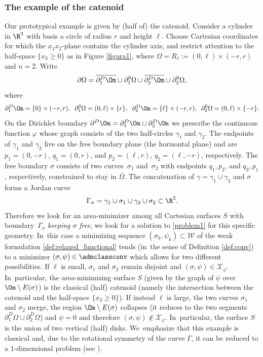 \subsubsection*{The example of the catenoid}
Our prototypical example is given by (half of) the catenoid.
Consider a cylinder in $\R^3$ with basis a circle of radius $r$
and height $\ell$.
Choose Cartesian coordinates for which the $x_1x_2$-plane
contains the cylinder axis, and restrict attention to the half-space
$\{x_3\geq0\}$ as
in Figure \ref{figura1},
where $\Omega=R_\ell := (0,\ell)\times(-r,r)$ and $n=2$.
Write
\[
\partial \Omega=\overline{\partial^D_1\Om}\cup\partial^0_1\Omega\cup \overline{\partial^D_2\Om}\cup \partial^0_2\Omega,
\]
where
\[
\partial^D_1\Om=\{0\}\times(-r,r),\;\; \partial^0_1\Omega=(0,\ell)\times\{r\},\;\; \partial^D_2\Om=\{\ell\}\times(-r,r),\;\; \partial^0_2\Omega=(0,\ell)\times\{-r\}.
\]
On the Dirichlet boundary $\partial^D\Om=\partial^D_1\Om\cup\partial^D_2\Om$ we prescribe the continuous function $\varphi$ whose graph
consists of the two half-circles $\gamma_1$ and $\gamma_2$. The endpoints of $\gamma_1$ and $\gamma_2$ live on the
free boundary plane (the horizontal plane) and are $p_1=(0,-r)$, $q_1=(0,r)$, and $p_2=(\ell,r)$, $q_2=(\ell,-r)$, respectively. The free boundary
$\sigma$ consists of two curves~$\sigma_1$ and~$\sigma_2$
with endpoints $q_1,p_2$, and $q_2,p_1$, respectively,
constrained to stay in $\overline\Omega$. The concatenation of $\gamma=\gamma_1\cup\gamma_2$ and $\sigma$
forms a Jordan curve
\begin{align}\label{gammasigma}
\Gamma_\sigma=\gamma_1\cup\sigma_1\cup\gamma_2\cup\sigma_2 \subset
\R^3.
\end{align}
Therefore we look for an area-minimizer
among all Cartesian surfaces $S$ with boundary~$\Gamma_\sigma$
{\it keeping $\sigma$ free}, \ie we look for a solution to \eqref{problem1} for this specific geometry. In~this case a minimizing sequence $(\sigma_k,\psi_k)\subset\mathcal W$ of the weak formulation \eqref{def:relaxed_functional} tends (in~the sense of Definition \ref{def:conv}) to a minimizer $(\sigma,\psi)\in \admclassconv$ which allows for two different possibilities. If $\ell$ is small, $\sigma_1$ and $\sigma_2$ remain disjoint and $(\sigma,\psi)\in\mathcal X_\varphi$. In~particular, the area-minimizing surface $S$ (given by the graph of $\psi$ over $\Om\setminus E(\sigma)$) is the classical (half) catenoid (namely the intersection between the catenoid and the half-space $\{x_3\geq0\}$). If instead $\ell$ is large, the two curves $\sigma_1$ and $\sigma_2$ merge, the region $\Om\setminus E(\sigma)$ collapses (\ie it reduces to the two segments $\partial_1^D\Omega\cup\partial_2^D\Omega$) and $\psi=0$ and therefore $(\sigma,\psi)\notin\mathcal X_\varphi$. In~particular, the surface $S$ is
the union of two vertical (half) disks. We~emphasize that this example is classical and, due
to the rotational symmetry of the curve $\Gamma$, it can be
reduced to a $1$-dimensional problem (see \cite{Greco,Bevi}).

